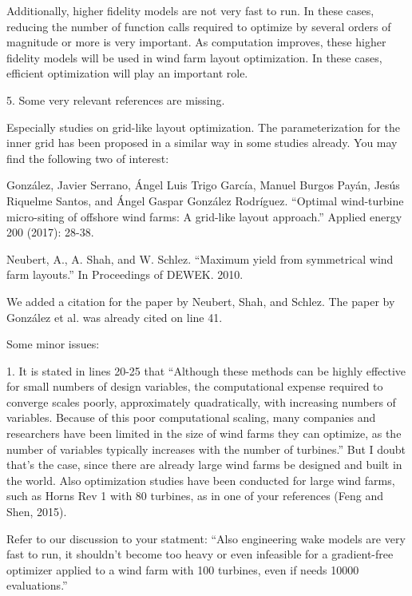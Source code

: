 \documentclass[12pt]{report}
\begin{document}
Additionally, higher fidelity models are not very fast to run. In these cases, reducing the number of function calls required to optimize by several orders of magnitude or more is very important. As computation improves, these higher fidelity models will be used in wind farm layout optimization. In these cases, efficient optimization will play an important role.

\color{black}
\bigskip

5. Some very relevant references are missing. 

Especially studies on grid-like layout optimization. The parameterization for the inner grid has been proposed in a similar way in some studies already. You may find the following two of interest: 

González, Javier Serrano, Ángel Luis Trigo García, Manuel Burgos Payán, Jesús Riquelme Santos, and Ángel Gaspar González Rodríguez. ``Optimal wind-turbine micro-siting of offshore wind farms: A grid-like layout approach.'' Applied energy 200 (2017): 28-38. 

Neubert, A., A. Shah, and W. Schlez. ``Maximum yield from symmetrical wind farm layouts.'' In Proceedings of DEWEK. 2010. 

\bigskip
\color{blue}

We added a citation for the paper by Neubert, Shah, and Schlez. The paper by González et al. was already cited on line 41.

\color{black}
\bigskip

Some minor issues: 

1. It is stated in lines 20-25 that ``Although these methods can be highly effective for small numbers of design variables, the computational expense required to converge scales poorly, approximately quadratically, with increasing numbers of variables. Because of this poor computational scaling, many companies and researchers have been limited in the size of wind farms they can optimize, as the number of variables typically increases with the number of turbines.'' But I doubt that’s the case, since there are already large wind farms be designed and built in the world. Also optimization studies have been conducted for large wind farms, such as Horns Rev 1 with 80 turbines, as in one of your references (Feng and Shen, 2015). 

\bigskip
\color{blue}

Refer to our discussion to your statment: ``Also engineering wake models are very fast to run, it shouldn’t become too heavy or even infeasible for a gradient-free optimizer applied to a wind farm with 100 turbines, even if needs 10000 evaluations.''
\end{document}
